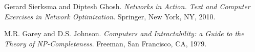 \begin{thebibliography}{9}

Gerard Sierksma and Diptesh Ghosh.
\emph{Networks in Action. Text and Computer Exercises in Network Optimization}.
Springer, New York, NY, 2010.

M.R. Garey and D.S. Johnson.
\emph{Computers and Intractability: a Guide to the Theory of NP-Completeness}.
Freeman, San Francisco, CA, 1979.

\end{thebibliography}
